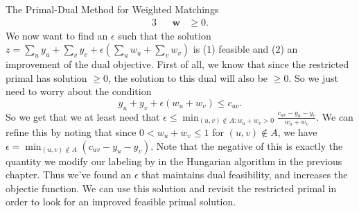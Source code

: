 \begin{section}{The Primal-Dual Method for Weighted Matchings}
\begin{alignat}{3}
				     && \mathbf{w} & \geq 0.
	\end{alignat}
	We now want to find an $\epsilon$ such that the solution $z = \sum_u y_u + \sum_v y_v + 
	\epsilon (\sum_u w_u + \sum_v w_v)$ is (1) feasible and (2) an improvement of the dual 
	objective. First of all, we know that since the restricted primal has solution $\geq 0$, 
	the solution to this dual will also be $\geq 0$. So we just need to worry about the condition 
	\[
		y_u + y_v + \epsilon (w_u + w_v) \leq c_{uv}.
	\]
	So we get that we at least need that $\epsilon \leq \min_{(u,v)\notin A: w_u + w_v > 0}
	\frac{c_{uv} - y_u - y_v}{w_u + w_v}$. We can refine this by noting that since 
	$0 < w_u + w_v \leq 1$ for $(u,v)\notin A$, we have $\epsilon = \min_{(u,v)\notin A} 
	(c_{uv} - y_u - y_v)$. Note that the negative of this is exactly the quantity we modify our 
	labeling by in the Hungarian algorithm in the previous chapter. Thus we've found an 
	$\epsilon$ that maintains dual feasibility, and increases the objectie function. We can use 
	this solution and revisit the restricted primal in order to look for an improved feasible 
	primal solution.
\end{section}

